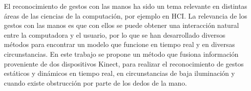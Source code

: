 
El reconocimiento de gestos con las manos ha sido un tema relevante en distintas áreas de las ciencias de la computación, por ejemplo en HCI. La relevancia de los gestos con las manos es que con ellos se puede obtener una interacción natural entre la computadora y el usuario, por lo que se han desarrollado diversos m\'etodos para encontrar un modelo que funcione en tiempo real y en diversas circunstancias. En este trabajo se propone un método que fusiona información proveniente de dos dispositivos Kinect, para realizar el reconocimiento de gestos estáticos y dinámicos en tiempo real, en circunstancias de baja iluminación y cuando existe obstrucción por parte de los dedos de la mano.